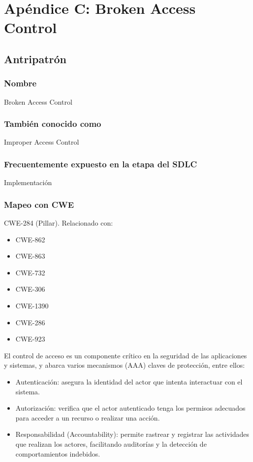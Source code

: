 
\chapter{Apéndice C: Broken Access Control}

\section{Antripatrón}

\subsection{Nombre}
Broken Access Control
\subsection{También conocido como}
Improper Access Control
\subsection{Frecuentemente expuesto en la etapa del SDLC}
Implementación
\subsection{Mapeo con CWE}
CWE-284 (Pillar). Relacionado con:
\begin{itemize}
    \item CWE-862
    \item CWE-863
    \item CWE-732
    \item CWE-306
    \item CWE-1390
    \item CWE-286
    \item CWE-923
\end{itemize}
El control de acceso es un componente crítico en la seguridad de las aplicaciones y sistemas, y abarca varios mecanismos (AAA) claves de protección, entre ellos:

    \begin{itemize}
        \item Autenticación: asegura la identidad del actor que intenta interactuar con el sistema.
        \item Autorización: verifica que el actor autenticado tenga los permisos adecuados para acceder a un recurso o realizar una acción.
        \item Responsabilidad (Accountability): permite rastrear y registrar las actividades que realizan los actores, facilitando auditorías y la detección de comportamientos indebidos.
    \end{itemize}

